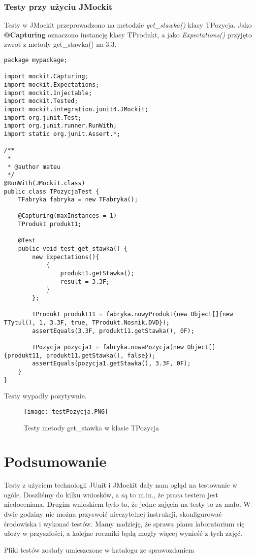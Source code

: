 \documentclass{article}
\begin{document}
\subsubsection{Testy przy użyciu JMockit}
Testy w JMockit przeprowadzono na metodzie \textit{get\_stawka()} klasy TPozycja. Jako \textbf{@Capturing} oznaczono instancję klasy TProdukt, a jako \textit{Expectations()} przyjęto zwrot z metody get\_stawka() na 3.3. 
\begin{verbatim}
package mypackage;

import mockit.Capturing;
import mockit.Expectations;
import mockit.Injectable;
import mockit.Tested;
import mockit.integration.junit4.JMockit;
import org.junit.Test;
import org.junit.runner.RunWith;
import static org.junit.Assert.*;

/**
 *
 * @author mateu
 */
@RunWith(JMockit.class)
public class TPozycjaTest {
    TFabryka fabryka = new TFabryka();
    
    @Capturing(maxInstances = 1)
    TProdukt produkt1;
    
    @Test
    public void test_get_stawka() {
        new Expectations(){
            {
                produkt1.getStawka();
                result = 3.3F;
            }
        };
        
        TProdukt produkt11 = fabryka.nowyProdukt(new Object[]{new TTytul(), 1, 3.3F, true, TProdukt.Nosnik.DVD}); 
        assertEquals(3.3F, produkt11.getStawka(), 0F);
        
        TPozycja pozycja1 = fabryka.nowaPozycja(new Object[]{produkt11, produkt11.getStawka(), false});
        assertEquals(pozycja1.getStawka(), 3.3F, 0F);         
    }   
}
\end{verbatim}
Testy wypadły pozytywnie.
\begin{figure}[!ht]
\centering
\texttt{[image: testPozycja.PNG]}
\caption{Testy metody get\_stawka w klasie TPozycja}
\end{figure}
\section{Podsumowanie}
Testy z użyciem technologii JUnit i JMockit dały nam ogląd na testowanie w ogóle. Doszliśmy do kilku wniosków, a są to m.in., że praca testera jest niedoceniana. Drugim wnioskiem było to, że jedne zajęcia na testy to za mało. W dwie godziny nie można przyswoić nieczytelnej instrukcji, skonfigurować środowiska i wykonać testów. Mamy nadzieję, że sprawa planu laboratorium się ułoży w przyszłości, a kolejne roczniki będą mogły więcej wynieść z tych zajęć. 

Pliki testów zostały umieszczone w katalogu ze sprawozdaniem
\end{document}
